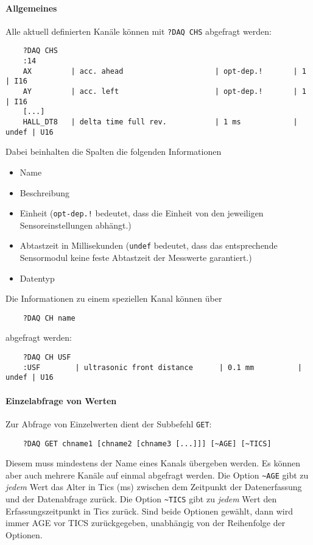 \paragraph{Allgemeines}

Alle aktuell definierten Kanäle können mit \verb|?DAQ CHS| abgefragt werden:
\begin{verbatim}
	?DAQ CHS
	:14
	AX         | acc. ahead                     | opt-dep.!       | 1     | I16 
	AY         | acc. left                      | opt-dep.!       | 1     | I16 
	[...]
	HALL_DT8   | delta time full rev.           | 1 ms            | undef | U16 
\end{verbatim}
Dabei beinhalten die Spalten die folgenden Informationen
\begin{itemize}
	\item Name
	\item Beschreibung
	\item Einheit (\verb|opt-dep.!| bedeutet, dass die Einheit von den jeweiligen Sensoreinstellungen abhängt.)
	\item Abtastzeit in Millisekunden (\verb|undef| bedeutet, dass das entsprechende Sensormodul keine feste Abtastzeit der Messwerte garantiert.)
	\item Datentyp
\end{itemize}

Die Informationen zu einem speziellen Kanal können über
\begin{verbatim}
	?DAQ CH name
\end{verbatim}
abgefragt werden:
\begin{verbatim}
	?DAQ CH USF
	:USF        | ultrasonic front distance      | 0.1 mm          | undef | U16
\end{verbatim}



\paragraph{Einzelabfrage von Werten}

Zur Abfrage von Einzelwerten dient der Subbefehl \verb|GET|:
\begin{verbatim}
	?DAQ GET chname1 [chname2 [chname3 [...]]] [~AGE] [~TICS]
\end{verbatim}
Diesem muss mindestens der Name eines Kanals übergeben werden. Es können aber auch mehrere Kanäle auf einmal abgefragt werden. Die Option \verb|~AGE| gibt zu \emph{jedem} Wert das Alter in Tics (\dah ms) zwischen dem Zeitpunkt der Datenerfassung und der Datenabfrage zurück. Die Option \verb|~TICS| gibt zu \emph{jedem} Wert den Erfassungszeitpunkt in Tics zurück. Sind beide Optionen gewählt, dann wird immer AGE vor TICS zurückgegeben, unabhängig von der Reihenfolge der Optionen.


